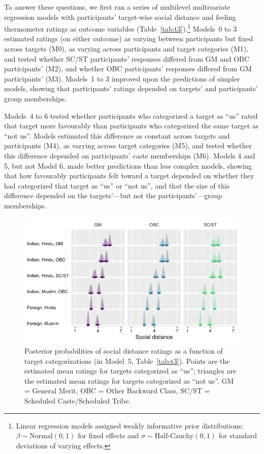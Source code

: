 \documentclass[12pt, a4paper]{article}
\begin{document}
To answer these questions, we first ran a series of multilevel multivariate regression models with participants' target-wise social distance and feeling thermometer ratings as outcome variables (Table~\ref{tab:t3}).\footnote{Linear regression models assigned weakly informative prior distributions: $\beta \sim \text{Normal}(0, 1)$ for fixed effects and $\sigma \sim \text{Half-Cauchy}(0, 1)$ for standard deviations of varying effects.} Models~0 to 3 estimated ratings (on either outcome) as varying between participants but fixed across targets (M0), as varying across participants and target categories (M1), and tested whether SC/ST participants' responses differed from GM and OBC participants' (M2), and whether OBC participants' responses differed from GM participants' (M3). Models~1 to 3 improved upon the predictions of simpler models, showing that participants' ratings depended on targets' and participants' group memberships. 

Models~4 to 6 tested whether participants who categorized a target as ``us'' rated that target more favourably than participants who categorized the same target as ``not us''. Models estimated this difference as constant across targets and participants (M4), as varying across target categories (M5), and tested whether this difference depended on participants' caste memberships (M6). Models 4 and 5, but not Model 6, made better predictions than less complex models, showing that how favourably participants felt toward a target depended on whether they had categorized that target as ``us'' or ``not us'', and that the size of this difference depended on the targets'---but not the participants'---group memberships.

\begin{figure}
\centering
\includegraphics[scale=1]{../figures/figure-5}
\caption{
Posterior probabilities of social distance ratings as a function of target categorizations (in Model~5, Table~\ref{tab:t3}). Points are the estimated mean ratings for targets categorized as ``us''; triangles are the estimated mean ratings for targets categorized as ``not us''. GM = General Merit, OBC = Other Backward Class, SC/ST = Scheduled Caste/Scheduled Tribe.
}
\label{fig:f5}
\end{figure}
\end{document}
